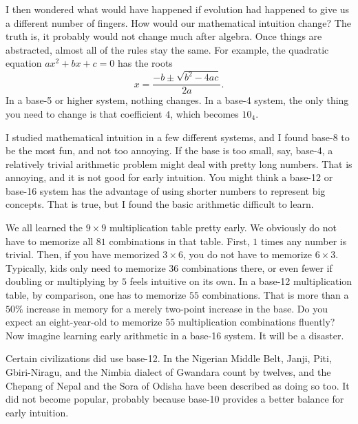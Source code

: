 I then wondered what would have happened if evolution had happened to give us a different number of fingers. How would our mathematical intuition change? The truth is, it probably would not change much after algebra. Once things are abstracted, almost all of the rules stay the same. For example, the quadratic equation $ax^{2} + bx + c = 0$ has the roots
\[
  x = \dfrac{-b \pm \sqrt{b^{2} - 4ac}}{2a}.
\]
In a base-5 or higher system, nothing changes. In a base-4 system, the only thing you need to change is that coefficient $4$, which becomes $10_{4}$.

I studied mathematical intuition in a few different systems, and I found base-8 to be the most fun, and not too annoying. If the base is too small, say, base-4, a relatively trivial arithmetic problem might deal with pretty long numbers. That is annoying, and it is not good for early intuition. You might think a base-12 or base-16 system has the advantage of using shorter numbers to represent big concepts. That is true, but I found the basic arithmetic difficult to learn.

We all learned the $9 \times 9$ multiplication table pretty early. We obviously do not have to memorize all $81$ combinations in that table. First, $1$ times any number is trivial. Then, if you have memorized $3 \times 6$, you do not have to memorize $6 \times 3$. Typically, kids only need to memorize $36$ combinations there, or even fewer if doubling or multiplying by $5$ feels intuitive on its own. In a base-12 multiplication table, by comparison, one has to memorize $55$ combinations. That is more than a $50\%$ increase in memory for a merely two-point increase in the base. Do you expect an eight-year-old to memorize $55$ multiplication combinations fluently? Now imagine learning early arithmetic in a base-16 system. It will be a disaster.

Certain civilizations did use base-12. In the Nigerian Middle Belt, Janji, Piti, Gbiri-Niragu, and the Nimbia dialect of Gwandara count by twelves, and the Chepang of Nepal and the Sora of Odisha have been described as doing so too. It did not become popular, probably because base-10 provides a better balance for early intuition.

